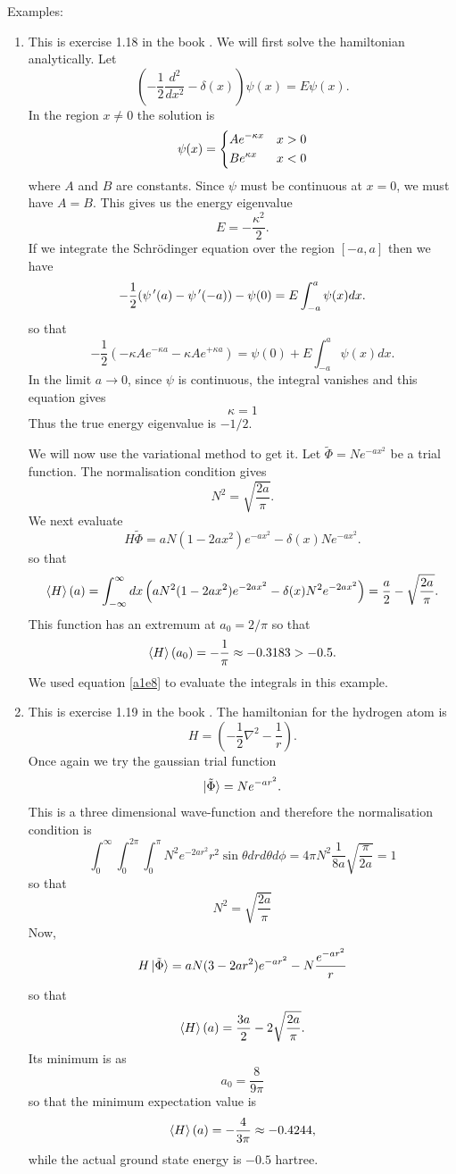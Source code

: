 Examples:
\begin{enumerate}
\item This is exercise 1.18 in the book \cite{so1989}. We will first solve
the hamiltonian analytically. Let
\[
\left(-\frac{1}{2}\frac{d^2}{dx^2} - \delta(x)\right)\psi(x)=E\psi(x).
\]
In the region $x \ne 0$ the solution is
\[
\psi(x)=\begin{dcases}Ae^{-\kappa x} & x > 0 \\Be^{\kappa x} & x < 0\end{dcases}
\]
where $A$ and $B$ are constants. Since $\psi$ must be continuous at $x = 0$,
we must have $A = B$. This gives us the energy eigenvalue
\[
E = -\frac{\kappa^2}{2}.
\]
If we integrate the Schr\"{o}dinger equation over the region $[-a, a]$ then
we have
\[
-\frac{1}{2}(\psi^{\,\prime}(a) - \psi^{\,\prime}(-a)) - \psi(0) = E
\int_{-a}^a\psi(x)dx.
\]
so that
\[
-\frac{1}{2}(-\kappa A e^{-\kappa a} - \kappa A e^{+\kappa a}) = 
\psi(0) + E\int_{-a}^a\psi(x)dx.
\]
In the limit $a \rightarrow 0$, since $\psi$ is continuous, the integral 
vanishes and this equation gives
\[
\kappa = 1
\]
Thus the true energy eigenvalue is $-1/2$.

We will now use the variational method to get it. Let $\tilde{\Phi} = Ne^{-ax^2}$
be a trial function. The normalisation condition gives 
\[
N^2 = \sqrt{\frac{2a}{\pi}}.
\]
We next evaluate
\[
H\tilde{\Phi} = aN(1 - 2ax^2)e^{-ax^2} - \delta(x)Ne^{-ax^2}.
\]
so that
\[
\braket{H}(a) = \int_{-\infty}^\infty dx\left(aN^2(1 - 2ax^2)e^{-2ax^2} - 
\delta(x)N^2 e^{-2ax^2}\right) = \frac{a}{2} - \sqrt{\frac{2a}{\pi}}.
\]
This function has an extremum at $a_0 = 2/\pi$ so that
\[
\braket{H}(a_0) = -\frac{1}{\pi} \approx -0.3183 > -0.5.
\]
We used equation \eqref{a1e8} to evaluate the integrals in this example.

\item This is exercise 1.19 in the book \cite{so1989}. The hamiltonian for the
hydrogen atom is
\[
H = \left(-\frac{1}{2}\nabla^2 - \frac{1}{r}\right).
\]
Once again we try the gaussian trial function
\[
\ket{\tilde{\Phi}} = Ne^{-ar^2}.
\]
This is a three dimensional wave-function and therefore the normalisation
condition is
\[
\int_0^\infty\int_0^{2\pi}\int_0^\pi N^2 e^{-2ar^2}r^2\sin\theta drd\theta d\phi
= 4\pi N^2 \frac{1}{8a}\sqrt{\frac{\pi}{2a}} = 1
\]
so that
\[
N^2 = \sqrt{\frac{2a}{\pi}}
\]
Now,
\[
H\ket{\tilde{\Phi}} = aN(3 - 2ar^2)e^{-ar^2} - N\frac{e^{-ar^2}}{r}
\]
so that
\[
\braket{H}(a) = \frac{3a}{2} - 2\sqrt{\frac{2a}{\pi}}.
\]
Its minimum is as 
\[
a_0 = \frac{8}{9\pi}
\]
so that the minimum expectation value is
\[
\braket{H}(a) = -\frac{4}{3\pi} \approx -0.4244,
\]
while the actual ground state energy is $-0.5$ hartree.
\end{enumerate}

